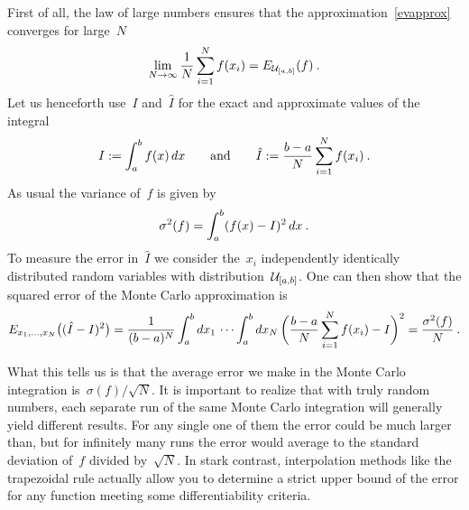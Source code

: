 First of all, the law of large numbers ensures that the
approximation~\eqref{evapprox} converges for large~$N$
%
\begin{equation}
  \lim_{N \to \infty} \frac{1}{N} \sum_{i = 1}^N f(x_i) = E_{\mathcal{U}_{[a,b]}}(f)\:.
\end{equation}
%
Let us henceforth use~$I$ and~$\hat{I}$ for the exact and approximate values of
the integral
%
\begin{equation}
  I := \int_a^b f(x) \,dx \qquad\text{and}\qquad
  \hat{I} := \frac{b-a}{N} \sum_{i=1}^N f(x_i)\:.
\end{equation}
%
As usual the variance of~$f$ is given by
%
\begin{equation}
  \sigma^2(f) = \int_a^b (f(x) - I)^2 \,dx\:.
\end{equation}
%
To measure the error in~$\hat{I}$ we consider the~$x_i$ independently
identically distributed random variables with distribution~$\mathcal{U}_{[a,b]}$. One
can then show that the squared error of the Monte Carlo approximation is
%
\begin{equation}\label{mcerror}
  E_{x_1, \dots , x_N}\bigl((\hat{I} - I)^2\bigr) =
  \frac{1}{(b-a)^N}\int_a^b dx_1\, \cdots \int_a^b dx_N\,
  \biggl(\frac{b-a}{N} \sum_{i=1}^N f(x_i) - I\biggr)^2 =
  \frac{\sigma^2(f)}{N}\:.
\end{equation}

What this tells us is that the average error we make in the Monte Carlo
integration is~$\sigma(f)/\sqrt{N}$. It is important to realize that with truly
random numbers, each separate run of the same Monte Carlo integration will
generally yield different results. For any single one of them the error could be
much larger than, but for infinitely many runs the error would average to the
standard deviation of~$f$ divided by~$\sqrt{N}$. In stark contrast,
interpolation methods like the trapezoidal rule actually allow you to determine
a strict upper bound of the error for any function meeting some
differentiability criteria.

